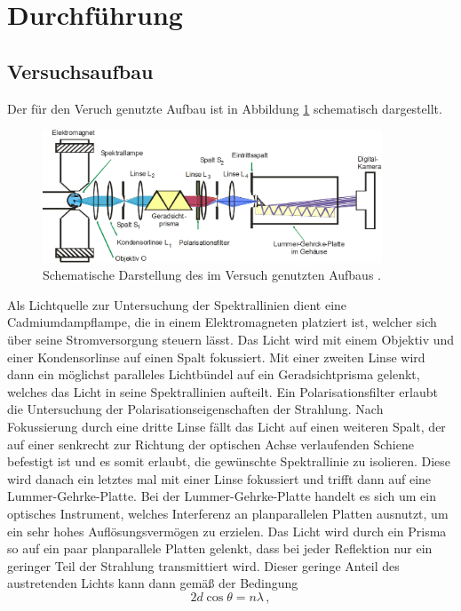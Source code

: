 \section{Durchführung}
\subsection{Versuchsaufbau}
Der für den Veruch genutzte Aufbau ist in Abbildung \ref{aufbau} schematisch dargestellt.
\begin{figure}
  \centering
  \includegraphics[width=0.9\textwidth]{Bilder/aufbau.png}
  \caption{Schematische Darstellung des im Versuch genutzten Aufbaus \cite{anleitung}.}
  \label{aufbau}
\end{figure}
Als Lichtquelle zur Untersuchung der Spektrallinien dient eine Cadmiumdampflampe, die in einem Elektromagneten platziert ist, welcher sich über seine Stromversorgung steuern lässt. Das Licht wird mit einem Objektiv und einer Kondensorlinse auf einen Spalt fokussiert. Mit einer zweiten Linse wird dann ein möglichst paralleles Lichtbündel auf ein Geradsichtprisma gelenkt, welches das Licht in seine Spektrallinien aufteilt. Ein Polarisationsfilter erlaubt die Untersuchung der Polarisationseigenschaften der Strahlung. Nach Fokussierung durch eine dritte Linse fällt das Licht auf einen weiteren Spalt, der auf einer senkrecht zur Richtung der optischen Achse verlaufenden Schiene befestigt ist und es somit erlaubt, die gewünschte Spektrallinie zu isolieren. Diese wird danach ein letztes mal mit einer Linse fokussiert und trifft dann auf eine Lummer-Gehrke-Platte.
Bei der Lummer-Gehrke-Platte handelt es sich um ein optisches Instrument, welches Interferenz an planparallelen Platten ausnutzt, um ein sehr hohes Auflösungsvermögen zu erzielen. Das Licht wird durch ein Prisma so auf ein paar planparallele Platten gelenkt, dass bei jeder Reflektion nur ein geringer Teil der Strahlung transmittiert wird. Dieser geringe Anteil des austretenden Lichts kann dann gemäß der Bedingung
\begin{equation}
2d\cos{\theta}=n\lambda\,,
\end{equation}
